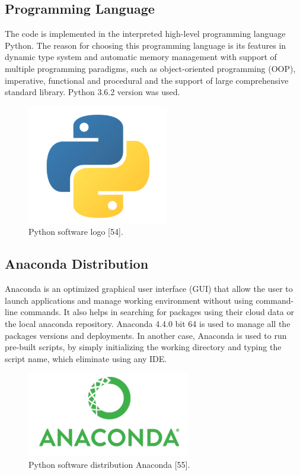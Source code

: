 \subsection{Programming Language}
\hspace{5mm} The code is implemented in the interpreted high-level programming language Python. The reason for choosing this programming language is its features in dynamic type system and automatic memory management with support of multiple programming paradigms, such as object-oriented programming (OOP), imperative, functional and procedural and the support of large comprehensive standard library.
Python 3.6.2 version was used.

\begin{figure}[ht]
\centering
\includegraphics{Figures/python}
\decoRule
\caption[Python software logo "54"]{Python software logo [54].}
\label{fig:la}
\end{figure}

\subsection{Anaconda Distribution}
\hspace{5mm} Anaconda is an optimized graphical user interface (GUI) that allow the user to launch applications and manage working environment without using command-line commands. It also helps in searching for packages using their cloud data or the local anaconda repository. Anaconda 4.4.0 bit 64 is used to manage all the packages versions and deployments. In another case, Anaconda is used to run pre-built scripts, by simply initializing the working directory and typing the script name, which eliminate using any IDE.
\begin{figure}[ht]
\centering
\includegraphics{Figures/anaconda}
\decoRule
\caption[Python software distribution Anaconda "55".]{Python software distribution Anaconda [55].}
\label{fig:la}
\end{figure}
